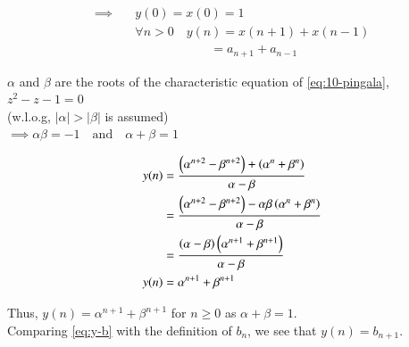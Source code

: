 \documentclass[journal,12pt,twocolumn]{IEEEtran}
\renewcommand\thesection{\arabic{section}}
\begin{document}
\begin{enumerate}[label=\thesection.\arabic*,ref=\thesection.\theenumi]
	\begin{align*}
		\implies \quad & y(0) = x(0) = 1 \\
			& \forall n > 0 \quad y(n) = x(n+1) + x(n-1) \\
			& \quad \quad \quad \quad \quad \quad = a_{n+1} + a_{n-1}
	\end{align*}

	$\alpha$ and $\beta$ are the roots of the characteristic equation of \eqref{eq:10-pingala}, $z^2 - z - 1 = 0$ \\
	(w.l.o.g, $|\alpha| > |\beta|$ is assumed) \\
	$\implies \alpha\beta = -1 \quad \text{and} \quad \alpha + \beta = 1$

	\begin{align}
		y(n) &= \frac{\left(\alpha^{n + 2} - \beta^{n + 2}\right) + \left(\alpha^{n} + \beta^{n}\right)}{\alpha - \beta} \nonumber \nonumber \\
			&= \frac{\left(\alpha^{n + 2} - \beta^{n + 2}\right) - \alpha\beta\left(\alpha^{n} + \beta^{n}\right)}{\alpha - \beta} \nonumber \\
			&= \frac{\left(\alpha - \beta\right)\left(\alpha^{n + 1} + \beta^{n + 1}\right)}{\alpha - \beta} \nonumber \\
		y(n) &= \alpha^{n + 1} + \beta^{n + 1} \label{eq:y-b}
	\end{align}

	Thus, $y(n) = \alpha^{n + 1} + \beta^{n + 1}$ for $n \geq 0$ as $\alpha + \beta = 1$. \\
	Comparing \eqref{eq:y-b} with the definition of $b_n$, we see that $y(n) = b_{n + 1}$.

\end{enumerate}
\end{document}

